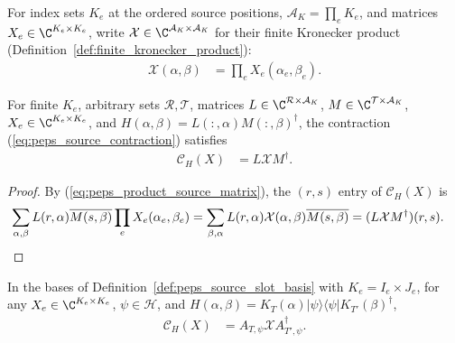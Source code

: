 For index sets $K_e$ at the ordered source positions, $\mathcal A_K=\prod_e K_e$,
and matrices $X_e\in\C^{K_e\times K_e}$, write
$\mathcal X\in\C^{\mathcal A_K\times\mathcal A_K}$ for their finite Kronecker
product (Definition~\ref{def:finite_kronecker_product}):
\begin{align}
    \mathcal X(\alpha,\beta)
     & =\prod_e X_e(\alpha_e,\beta_e).
    \label{eq:peps_product_source_matrix}
\end{align}

\begin{lemma}
    \label{thm:peps_source_column_contraction}
    \leanok
    For finite $K_e$, arbitrary sets $\mathcal R,\mathcal T$, matrices
    $L\in\C^{\mathcal R\times\mathcal A_K}$,
    $M\in\C^{\mathcal T\times\mathcal A_K}$, $X_e\in\C^{K_e\times K_e}$, and
    $H(\alpha,\beta)=L(:,\alpha)M(:,\beta)^\dagger$, the contraction
    (\ref{eq:peps_source_contraction}) satisfies
    \begin{align}
        \mathcal C_H(X) & =L\mathcal X M^\dagger.
        \label{eq:peps_source_column_contraction}
    \end{align}
\end{lemma}

\begin{proof}\leanok
    By (\ref{eq:peps_product_source_matrix}), the $(r,s)$ entry of
    $\mathcal C_H(X)$ is
    \begin{align}
        \sum_{\alpha,\beta}
        L(r,\alpha)\overline{M(s,\beta)}
        \prod_e X_e(\alpha_e,\beta_e)
         & =\sum_{\beta,\alpha}
        L(r,\alpha)\mathcal X(\alpha,\beta)
        \overline{M(s,\beta)}
        =(L\mathcal X M^\dagger)(r,s).\notag
    \end{align}
\end{proof}

\begin{lemma}
    \label{thm:peps_pure_source_contraction}
    \leanok
    In the bases of Definition~\ref{def:peps_source_slot_basis} with
    $K_e=I_e\times J_e$, for any $X_e\in\C^{K_e\times K_e}$, $\psi\in\mathcal H$,
    and $H(\alpha,\beta)=K_T(\alpha)|\psi\rangle\langle\psi|K_{T'}(\beta)^\dagger$,
    \begin{align}
        \mathcal C_H(X)
         & =A_{T,\psi}\mathcal X A_{T',\psi}^\dagger.
        \label{eq:peps_pure_source_contraction}
    \end{align}
\end{lemma}


